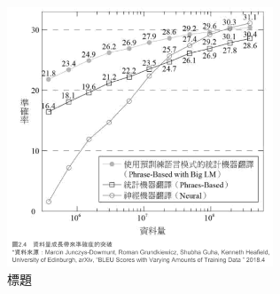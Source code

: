 \documentclass[a4paper,12pt]{article}
\begin{document}
\begin{itemize}
\begin{figure}[htbp]
\centering
\includegraphics[width=300]{images/機器學習/2023-02-04_21-01-03_2023-02-04_21-00-50.png}
\caption{\label{fig:Name}標題}
\end{figure}


\end{itemize}
\end{document}
